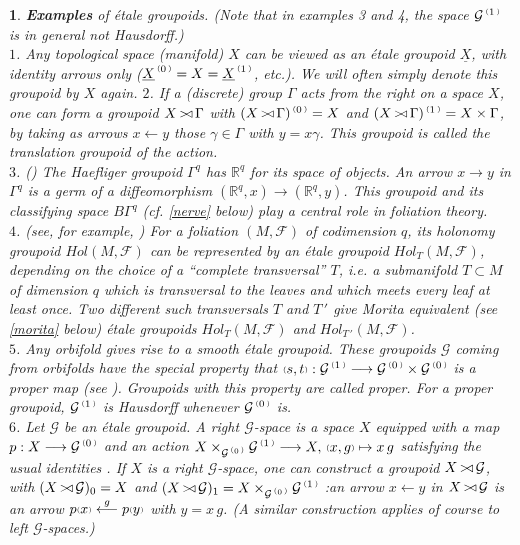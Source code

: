 \documentclass[a4paper]{article}
\newtheorem{num}[st]{}
\newcommand{\rmap}{\longrightarrow}
\newcommand{\lmap}{\longleftarrow}
\newcommand{\G}{\ensuremath{\mathcal{G}}}
\newcommand{\F}{\ensuremath{\mathcal{F}}}
\newcommand{\ps}{{\raise 1pt\hbox{\tiny (}}}
\newcommand{\pd}{{\raise 1pt\hbox{\tiny )}}}
\newcommand{\nG}[1]{\ensuremath{\G^{\,\ps #1\,\pd}}}
\def\cross{\mathinner{\mathrel{\raise0.8pt\hbox{$\scriptstyle>$}}
                 \joinrel\mathrel\triangleleft}}
\begin{document}
\begin{num}
\label{ex1}
\emph{
{\bf Examples} of \'etale groupoids. (Note that in examples 3 and 4, the space $\nG{1}$ is in general not Hausdorff.)\\
 \hspace*{.3in} $1$. Any topological space (manifold) $X$ can be viewed as an \'etale groupoid $\underline{X}$, with identity arrows only ($\underline{X}^{\,\ps 0\,\pd} = X = \underline{X}^{\,\ps 1\,\pd}$, etc.). We will often simply denote this groupoid by $X$ again.\newline
\hspace*{.3in} $2$. If a (discrete) group $\Gamma$ acts from the right on a space $X$, one can form a groupoid $X\cross \Gamma$ with $(X\cross \Gamma)^{\,\ps 0\,\pd} = X$ and $(X\cross \Gamma)^{\,\ps 1\,\pd} = X \times \Gamma$, by taking as arrows $x\lmap y$ those  $\gamma \in \Gamma$ with $y = x\gamma $. This groupoid is called the translation groupoid of the action.\\
\hspace*{.3in} $3$. (\cite{Ha2, Bo}) The Haefliger groupoid $\Gamma^{q}$ has $\mathbb{R}^{q}$ for its space of objects. An arrow $x\rmap y$ in $\Gamma^{q}$ is a germ of a diffeomorphism $(\mathbb{R}^{q}, x)\rmap (\mathbb{R}^{q}, y)$. This groupoid and its classifying space $B\Gamma^{q}$ (cf. \ref{nerve} below) play a central role in foliation theory.\\
\hspace*{.3in} $4$. (see, for example, \cite{Wi, CoOp, Fourier}) For a foliation $(M, \F)$ of codimension $q$, its holonomy groupoid $Hol(M, \F)$ can be represented by an \'etale groupoid $Hol_{T}(M, \F)$, depending on the choice of a ``complete transversal'' $T$, i.e. a submanifold $T \subset M$ of dimension $q$ which is transversal to the leaves and which meets every leaf at least once. Two different such transversals $T$ and $T\, '$ give Morita equivalent (see \ref{morita} below) \'etale groupoids $Hol_{T}(M, \F)$ and $Hol_{T\, '}(M, \F)$.\\
\hspace*{.3in} $5$. Any orbifold gives rise to a smooth \'etale groupoid. These groupoids $\G$ coming from orbifolds have the special property that $\ps s, t \pd: \nG{1}\rmap \nG{0} \times \nG{0}$ is a proper map (see \cite{MP}). Groupoids with this property are called proper. For a proper groupoid, $\nG{1}$ is Hausdorff whenever $\nG{0}$ is.\\
\hspace*{.3in} $6$. Let $\G$ be an \'etale groupoid. A right \G-space is a space $X$ equipped with a map $p: X \rmap \nG{0}$ and an action $ X\times_{\nG{0}} \nG{1} \rmap X , \, \ps x, g\pd \mapsto x\, g$ satisfying the usual identities . If $X$ is a right $\G$-space, one can construct a groupoid $X \cross \G$, with $(X \cross \G)_{0}= X$ and $(X \cross \G)_{1}= X \times_{\nG{0}} \nG{1}$ :\linebreak an arrow $x \lmap y$ in $X \cross \G$ is an arrow $p\ps x\pd \stackrel{g}{\lmap} p\ps y\pd$ with $y= x\, g$. (A similar construction applies of course to left $\G$-spaces.)
}
\end{num}
\end{document}
